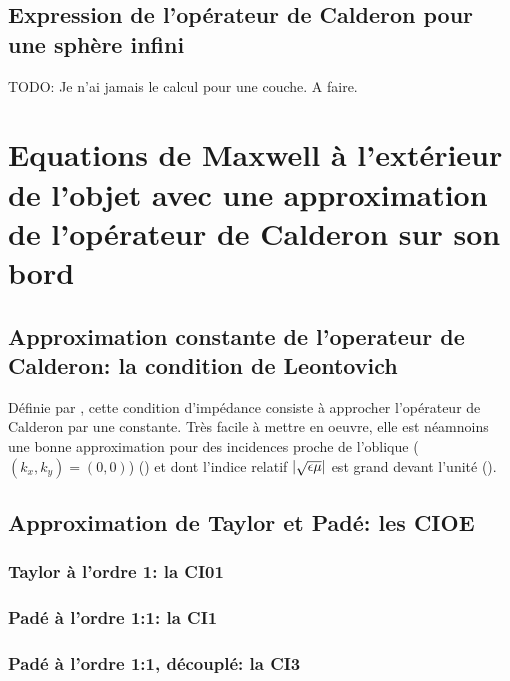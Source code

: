     \subsection{Expression de l'opérateur de Calderon pour une sphère infini}

        \begin{REM}
            TODO: Je n'ai jamais le calcul pour une couche. A faire.
        \end{REM}

\section[Problème extérieur et condition limite de Calderon]{Equations de Maxwell à l'extérieur de l'objet avec une approximation de l'opérateur de Calderon sur son bord}

    \subsection{Approximation constante de l'operateur de Calderon: la condition de Leontovich}
        
        Définie par \cite{leontovich_investigations_1948}, cette condition d'impédance consiste à approcher l'opérateur de Calderon par une constante.
        Très facile à mettre en oeuvre, elle est néamnoins une bonne approximation pour des incidences proche de l'oblique (\((k_x,k_y)=(0,0)\)) (\cite{leontovich_investigations_1948}) et dont l'indice relatif \(|\sqrt{\epsilon\mu}|\) est grand devant l'unité (\cite[par.~3, p.421-422]{senior_impedance_1960}).

    \subsection{Approximation de Taylor et Padé: les CIOE}

        \subsubsection{Taylor à l'ordre 1: la CI01}

        \subsubsection{Padé à l'ordre 1:1: la CI1}

        \subsubsection{Padé à l'ordre 1:1, découplé: la CI3}

